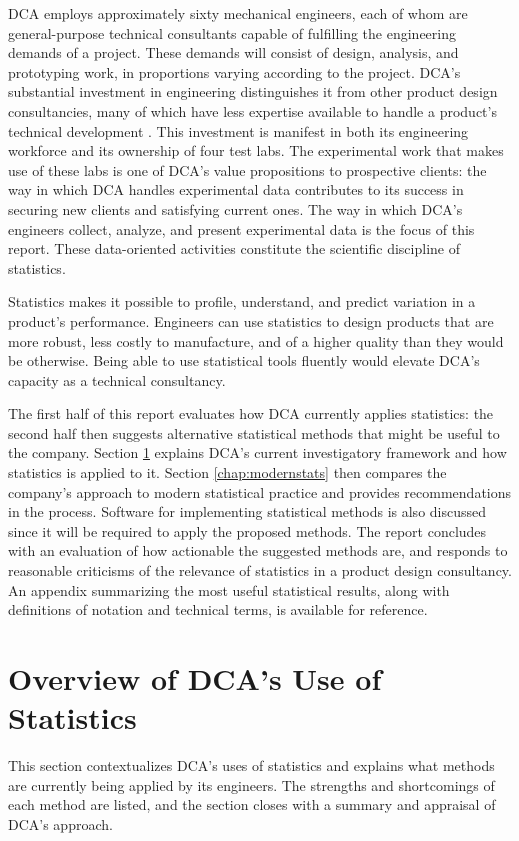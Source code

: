 \documentclass[11pt,a4paper,article]{memoir} %
\begin{document}
DCA employs approximately sixty mechanical engineers, each of whom are general-purpose technical consultants capable of fulfilling the engineering demands of a project. These demands will consist of design, analysis, and prototyping work, in proportions varying according to the project. DCA's substantial investment in engineering distinguishes it from other product design consultancies, many of which have less expertise available to handle a product's technical development \cite{designweek}. This investment is manifest in both its engineering workforce and its ownership of four test labs. The experimental work that makes use of these labs is one of DCA's value propositions to prospective clients: the way in which DCA handles experimental data contributes to its success in securing new clients and satisfying current ones. The way in which DCA's engineers collect, analyze, and present experimental data is the focus of this report. These data-oriented activities constitute the scientific discipline of statistics.
\par
Statistics makes it possible to profile, understand, and predict variation in a product's performance. Engineers can use statistics to design products that are more robust, less costly to manufacture, and of a higher quality than they would be otherwise. Being able to use statistical tools fluently would elevate DCA's capacity as a technical consultancy.
\par
The first half of this report evaluates how DCA currently applies statistics: the second half then suggests alternative statistical methods that might be useful to the company. Section \ref{chap:dca} explains DCA's current investigatory framework and how statistics is applied to it. Section \ref{chap:modernstats} then compares the company's approach to modern statistical practice and provides recommendations in the process. Software for implementing statistical methods is also discussed since it will be required to apply the proposed methods. The report concludes with an evaluation of how actionable the suggested methods are, and responds to reasonable criticisms of the relevance of statistics in a product design consultancy. An appendix summarizing the most useful statistical results, along with definitions of notation and technical terms, is available for reference.

\newpage



\chapter {Overview of DCA's Use of Statistics}
\label{chap:dca}
This section contextualizes DCA's uses of statistics and explains what methods are currently being applied by its engineers. The strengths and shortcomings of each method are listed, and the section closes with a summary and appraisal of DCA's approach.
\end{document}
